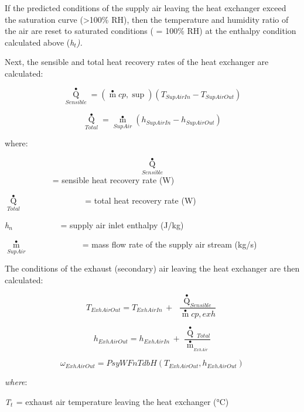 If the predicted conditions of the supply air leaving the heat exchanger exceed the saturation curve (\textgreater{}100\% RH), then the temperature and humidity ratio of the air are reset to saturated conditions ( = 100\% RH) at the enthalpy condition calculated above (\emph{h\(_{t}\)).}

Next, the sensible and total heat recovery rates of the heat exchanger are calculated:

\begin{equation}
{\mathop Q\limits^ \bullet_{Sensible}} = \left( {\mathop m\limits^ \bullet  cp,\sup } \right)({T_{SupAirIn}} - {T_{SupAirOut}})
\end{equation}

\begin{equation}
{\mathop Q\limits^ \bullet_{Total}} = {\mathop m\limits^ \bullet_{SupAir}}({h_{SupAirIn}} - {h_{SupAirOut}})
\end{equation}

where:

\[{\mathop Q\limits^ \bullet_{Sensible}}\] ~~~~~~~~~~~ = sensible heat recovery rate (W)

\({\mathop Q\limits^ \bullet_{Total}}\) ~~~~~~~~~~~~~~ = total heat recovery rate (W)

\emph{h\(_{n}\)}~~~~~~~~~~~ = supply air inlet enthalpy (J/kg)

\({\mathop m\limits^ \bullet_{SupAir}}\) ~~~~~~~~~~~~ = mass flow rate of the supply air stream (kg/s)

The conditions of the exhaust (secondary) air leaving the heat exchanger are then calculated:

\begin{equation}
{T_{ExhAirOut}} = {T_{ExhAirIn}}\, + \,\,\frac{{{{\mathop Q\limits^ \bullet  }_{Sensible}}}}{{\mathop m\limits^ \bullet  cp,exh}}
\end{equation}

\begin{equation}
{h_{ExhAirOut}} = {h_{ExhAirIn}}\, + \,\,\frac{{\mathop Q\limits^ \bullet  {\,_{Total}}}}{{{{\mathop m\limits^ \bullet  }_{_{ExhAir}}}}}
\end{equation}

\begin{equation}
{\omega_{ExhAirOut}} = PsyWFnTdbH({T_{ExhAirOut}},{h_{ExhAirOut}})
\end{equation}

\emph{where}:

\emph{T\(_{t}\)}\(_{ }\) = exhaust air temperature leaving the heat exchanger (°C)

